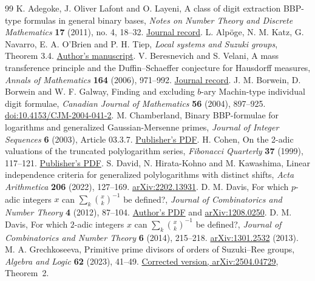 \documentclass[11pt]{article}
\begin{document}
{\small\begin{thebibliography}{99}
 K. Adegoke, J. Oliver Lafont and O. Layeni, A class of digit extraction BBP-type formulas in general binary bases, \emph{Notes on Number Theory and Discrete Mathematics} \textbf{17} (2011), no. 4, 18--32. \href{https://nntdm.net/volume-17-2011/number-4/18-32/}{Journal record}.
 L. Alp\"oge, N. M. Katz, G. Navarro, E. A. O'Brien and P. H. Tiep, \emph{Local systems and Suzuki groups}, Theorem 3.4. \href{https://web.math.princeton.edu/~nmk/kt21_45bis.pdf}{Author's manuscript}.
 V. Beresnevich and S. Velani, A mass transference principle and the Duffin--Schaeffer conjecture for Hausdorff measures, \emph{Annals of Mathematics} \textbf{164} (2006), 971--992. \href{https://annals.math.princeton.edu/2006/164-3/p06}{Journal record}.
 J. M. Borwein, D. Borwein and W. F. Galway, Finding and excluding $b$-ary Machin-type individual digit formulae, \emph{Canadian Journal of Mathematics} \textbf{56} (2004), 897--925. \href{https://doi.org/10.4153/CJM-2004-041-2}{doi:10.4153/CJM-2004-041-2}.
 M. Chamberland, Binary BBP-formulae for logarithms and generalized Gaussian-Mersenne primes, \emph{Journal of Integer Sequences} \textbf{6} (2003), Article 03.3.7. \href{https://cs.uwaterloo.ca/journals/JIS/VOL6/Chamberland/chamberland60.pdf}{Publisher's PDF}.
 H. Cohen, On the 2-adic valuations of the truncated polylogarithm series, \emph{Fibonacci Quarterly} \textbf{37} (1999), 117--121. \href{https://www.fq.math.ca/Scanned/37-2/cohen.pdf}{Publisher's PDF}.
 S. David, N. Hirata-Kohno and M. Kawashima, Linear independence criteria for generalized polylogarithms with distinct shifts, \emph{Acta Arithmetica} \textbf{206} (2022), 127--169. \href{https://arxiv.org/abs/2202.13931}{arXiv:2202.13931}.
 D. M. Davis, For which $p$-adic integers $x$ can $\sum_k\binom{x}{k}^{-1}$ be defined?, \emph{Journal of Combinatorics and Number Theory} \textbf{4} (2012), 87--104. \href{https://www.lehigh.edu/~dmd1/define3.pdf}{Author's PDF} and \href{https://arxiv.org/abs/1208.0250}{arXiv:1208.0250}.
 D. M. Davis, For which $2$-adic integers $x$ can $\sum_k\binom{x}{k}^{-1}$ be defined?, \emph{Journal of Combinatorics and Number Theory} \textbf{6} (2014), 215--218. \href{https://arxiv.org/abs/1301.2532}{arXiv:1301.2532} (2013).
 M. A. Grechkoseeva, Primitive prime divisors of orders of Suzuki--Ree groups, \emph{Algebra and Logic} \textbf{62} (2023), 41--49. \href{https://arxiv.org/abs/2504.04729}{Corrected version, arXiv:2504.04729}, Theorem~2.

\end{thebibliography}}
\end{document}
